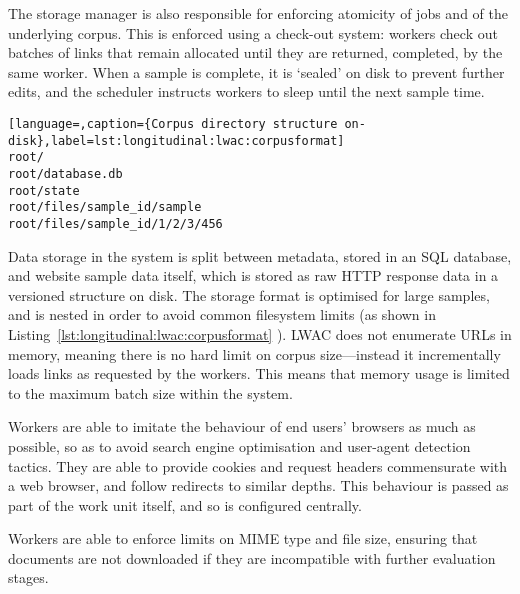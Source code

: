 The storage manager is also responsible for enforcing atomicity of jobs and of the underlying corpus.  This is enforced using a check-out system: workers check out batches of links that remain allocated until they are returned, completed, by the same worker.  When a sample is complete, it is `sealed' on disk to prevent further edits, and the scheduler instructs workers to sleep until the next sample time.


\begin{lstlisting}[language=,caption={Corpus directory structure on-disk},label=lst:longitudinal:lwac:corpusformat]
root/
root/database.db
root/state
root/files/sample_id/sample
root/files/sample_id/1/2/3/456
\end{lstlisting}



Data storage in the system is split between metadata, stored in an SQL database, and website sample data itself, which is stored as raw HTTP response data in a versioned structure on disk.  The storage format is optimised for large samples, and is nested in order to avoid common filesystem limits (as shown in Listing~\ref{lst:longitudinal:lwac:corpusformat}
).  LWAC does not enumerate URLs in memory, meaning there is no hard limit on corpus size---instead it incrementally loads links as requested by the workers.  This means that memory usage is limited to the maximum batch size within the system.

Workers are able to imitate the behaviour of end users' browsers as much as possible, so as to avoid search engine optimisation and user-agent detection tactics.  They are able to provide cookies and request headers commensurate with a web browser, and follow redirects to similar depths.  This behaviour is passed as part of the work unit itself, and so is configured centrally.

Workers are able to enforce limits on MIME type and file size, ensuring that documents are not downloaded if they are incompatible with further evaluation stages.

